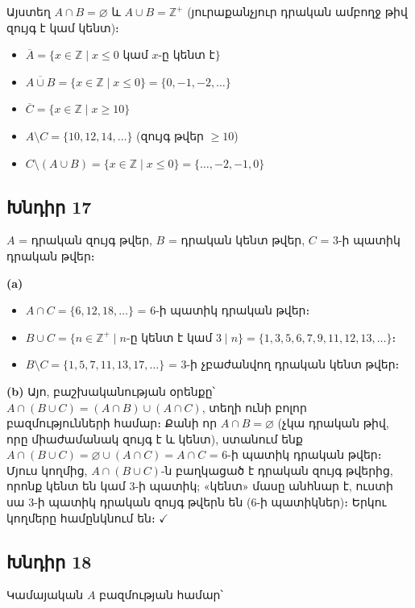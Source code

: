 Այստեղ $A \cap B = \varnothing$ և $A \cup B = \mathbb{Z}^+$ (յուրաքանչյուր դրական ամբողջ թիվ զույգ է կամ կենտ)։
\begin{itemize}
  \item $\boxed{\overline{A} = \{x \in \mathbb{Z} \mid x \le 0 \text{ կամ } x \text{-ը կենտ է}\}}$
  \item $\boxed{\overline{A \cup B} = \{x \in \mathbb{Z} \mid x \le 0\} = \{0,-1,-2,\ldots\}}$
  \item $\boxed{\overline{C} = \{x \in \mathbb{Z} \mid x \ge 10\}}$
  \item $\boxed{A \setminus C = \{10, 12, 14, \ldots\}}$ \quad (զույգ թվեր $\ge 10$)
  \item $\boxed{C \setminus (A \cup B) = \{x \in \mathbb{Z} \mid x \le 0\} = \{\ldots, -2, -1, 0\}}$
\end{itemize}

\subsection*{Խնդիր 17}
$A$ = դրական զույգ թվեր, $B$ = դրական կենտ թվեր, $C$ = 3-ի պատիկ դրական թվեր։

\textbf{(a)}
\begin{itemize}
  \item $A \cap C = \{6, 12, 18, \ldots\}$ = 6-ի պատիկ դրական թվեր։
  \item $B \cup C = \{n \in \mathbb{Z}^+ \mid n \text{-ը կենտ է կամ } 3 \mid n\} = \{1,3,5,6,7,9,11,12,13,\ldots\}$։
  \item $B \setminus C = \{1, 5, 7, 11, 13, 17, \ldots\}$ = 3-ի չբաժանվող դրական կենտ թվեր։
\end{itemize}

\textbf{(b)} Այո, բաշխականության օրենքը՝ $A \cap (B \cup C) = (A \cap B) \cup (A \cap C)$, տեղի ունի բոլոր բազմությունների համար։ Քանի որ $A \cap B = \varnothing$ (չկա դրական թիվ, որը միաժամանակ զույգ է և կենտ), ստանում ենք $A \cap (B \cup C) = \varnothing \cup (A \cap C) = A \cap C$ = 6-ի պատիկ դրական թվեր։ Մյուս կողմից, $A \cap (B \cup C)$-ն բաղկացած է դրական զույգ թվերից, որոնք կենտ են կամ 3-ի պատիկ; «կենտ» մասը անհնար է, ուստի սա 3-ի պատիկ դրական զույգ թվերն են (6-ի պատիկներ)։ Երկու կողմերը համընկնում են։ $\checkmark$

\subsection*{Խնդիր 18}
Կամայական $A$ բազմության համար՝

